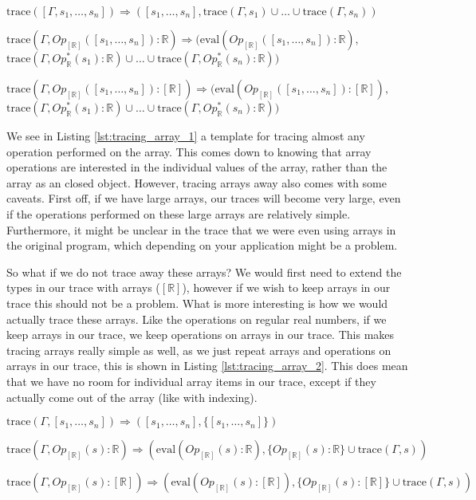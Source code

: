         \begin{quicklst}[caption=Tracing away arrays, label=lst:tracing_array_1, gobble=12]
            $\text{trace}([\Gamma,s_1,\dots,s_n])\Rightarrow([s_1,\dots,s_n],\text{trace}(\Gamma,s_1)\cup\dots\cup\text{trace}(\Gamma,s_n))$

            $\text{trace}(\Gamma,Op_{[\mathbb{R}]}([s_1,\dots,s_n]):\mathbb{R})\Rightarrow(\text{eval}(Op_{[\mathbb{R}]}([s_1,\dots,s_n]):\mathbb{R}),$
                $\text{trace}(\Gamma,Op^*_\mathbb{R}(s_1):\mathbb{R})\cup\dots\cup\text{trace}(\Gamma,Op^*_\mathbb{R}(s_n):\mathbb{R}))$

            $\text{trace}(\Gamma,Op_{[\mathbb{R}]}([s_1,\dots,s_n]):[\mathbb{R}])\Rightarrow(\text{eval}(Op_{[\mathbb{R}]}([s_1,\dots,s_n]):[\mathbb{R}]),$
                $\text{trace}(\Gamma,Op^*_\mathbb{R}(s_1):\mathbb{R})\cup\dots\cup\text{trace}(\Gamma,Op^*_\mathbb{R}(s_n):\mathbb{R}))$
        \end{quicklst}

        We see in Listing \ref{lst:tracing_array_1} a template for tracing almost any operation performed on the array.
        This comes down to knowing that array operations are interested in the individual values of the array, rather than the array as an closed object.
        However, tracing arrays away also comes with some caveats.
        First off, if we have large arrays, our traces will become very large, even if the operations performed on these large arrays are relatively simple.
        Furthermore, it might be unclear in the trace that we were even using arrays in the original program, which depending on your application might be a problem.

        So what if we do not trace away these arrays?
        We would first need to extend the types in our trace with arrays ($[\mathbb{R}]$), however if we wish to keep arrays in our trace this should not be a problem.
        What is more interesting is how we would actually trace these arrays.
        Like the operations on regular real numbers, if we keep arrays in our trace, we keep operations on arrays in our trace.
        This makes tracing arrays really simple as well, as we just repeat arrays and operations on arrays in our trace, this is shown in Listing \ref{lst:tracing_array_2}.
        This does mean that we have no room for individual array items in our trace, except if they actually come out of the array (like with indexing).

        \begin{quicklst}[caption=Keeping arrays in traces, label=lst:tracing_array_2, gobble=12]
            $\text{trace}(\Gamma,[s_1,\dots,s_n])\Rightarrow([s_1,\dots,s_n],\{[s_1,\dots,s_n]\})$

            $\text{trace}(\Gamma,Op_{[\mathbb{R}]}(s):\mathbb{R})\Rightarrow(\text{eval}(Op_{[\mathbb{R}]}(s):\mathbb{R}),\{Op_{[\mathbb{R}]}(s):\mathbb{R}\}\cup\text{trace}(\Gamma,s))$

            $\text{trace}(\Gamma,Op_{[\mathbb{R}]}(s):[\mathbb{R}])\Rightarrow(\text{eval}(Op_{[\mathbb{R}]}(s):[\mathbb{R}]),\{Op_{[\mathbb{R}]}(s):[\mathbb{R}]\}\cup\text{trace}(\Gamma,s))$
        \end{quicklst}